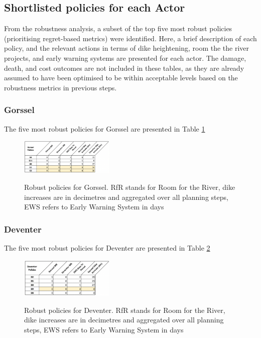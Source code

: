 \subsection{Shortlisted policies for each Actor}
From the robustness analysis, a subset of the top five most robust policies (prioritising regret-based metrics) were identified. Here, a brief description of each policy, and the relevant actions in terms of dike heightening, room the the river projects, and early warning systems are presented for each actor. The damage, death, and cost outcomes are not included in these tables, as they are already assumed to have been optimised to be within acceptable levels based on the robustness metrics in previous steps.
\subsubsection{Gorssel}
The five most robust policies for Gorssel are presented in Table \ref{fig:gpols}

\begin{figure}[h]
    \centering
    \caption{Robust policies for Gorssel. RfR stands for Room for the River, dike increases are in decimetres and aggregated over all planning steps, EWS refers to Early Warning System in days}
    \includegraphics[width=0.4\textwidth]{report/figures/gpols.png}
    \label{fig:gpols}
\end{figure}




\subsubsection{Deventer}
The five most robust policies for Deventer are presented in Table \ref{fig:dpols}

\begin{figure}[h]
    \centering
    \caption{Robust policies for Deventer. RfR stands for Room for the River, dike increases are in decimetres and aggregated over all planning steps, EWS refers to Early Warning System in days}
    \includegraphics[width=0.4\textwidth]{report/figures/dpols.png}
    \label{fig:dpols}
\end{figure}

